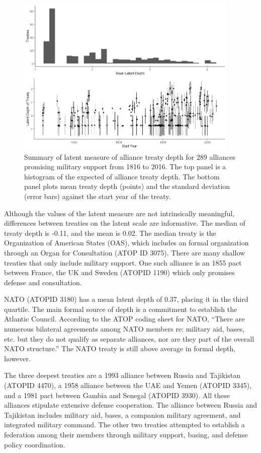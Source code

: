 \documentclass[12pt]{article}
\begin{document}
\begin{figure}
	\centering
		\includegraphics[width=0.95\textwidth]{../figures/ld-summary.png}
	\caption{Summary of latent measure of alliance treaty depth for 289 alliances promising military support from 1816 to 2016. The top panel is a histogram of the expected of alliance treaty depth. The bottom panel plots mean treaty depth (points) and the standard deviation (error bars) against the start year of the treaty.}
	\label{fig:ld-summary}
\end{figure}


Although the values of the latent measure are not intrinsically meaningful, differences between treaties on the latent scale are informative. 
The median of treaty depth is -0.11, and the mean is 0.02. 
The median treaty is the Organization of American States (OAS), which includes an formal organization through an Organ for Consultation (ATOP ID 3075). 
There are many shallow treaties that only include military support. 
One such alliance is an 1855 pact between France, the UK and Sweden (ATOPID 1190) which only promises defense and consultation. 


NATO (ATOPID 3180) has a mean latent depth of 0.37, placing it in the third quartile. 
The main formal source of depth is a commitment to establish the Atlantic Council. 
According to the ATOP coding sheet for NATO, ``There are numerous bilateral agreements among NATO members re: military aid, bases, etc. but they do not qualify as separate alliances, nor are they part of the overall NATO structure.''
The NATO treaty is still above average in formal depth, however. 


The three deepest treaties are a 1993 alliance between Russia and Tajikistan (ATOPID 4470), a 1958 alliance between the UAE and Yemen (ATOPID 3345), and a 1981 pact between Gambia and Senegal (ATOPID 3930). 
All these alliances stipulate extensive defense cooperation. 
The alliance between Russia and Tajikistan includes military aid, bases, a companion military agreement, and integrated military command. 
The other two treaties attempted to establish a federation among their members through military support, basing, and defense policy coordination. 
\end{document}
